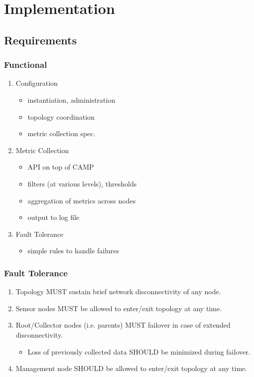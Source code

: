 \chapter{Implementation}
\label{implementation}

\section{Requirements}

\subsection{Functional}

\begin{enumerate}

\item Configuration
      \begin{itemize}
      \item instantiation, administration
      \item topology coordination
      \item metric collection spec.
      \end{itemize}

\item Metric Collection
      \begin{itemize}
      \item \dcamp API on top of CAMP
      \item filters (at various levels), thresholds
      \item aggregation of metrics across nodes
      \item output to log file
      \end{itemize}

\item Fault Tolerance
      \begin{itemize}
      \item simple rules to handle failures
      \end{itemize}

\end{enumerate}

\subsection{Fault Tolerance}

\begin{enumerate}

\item Topology MUST sustain brief network disconnectivity of any node.
\item Sensor nodes MUST be allowed to enter/exit topology at any time.
\item Root/Collector nodes (i.e. parents) MUST failover in case of extended disconnectivity.
      \begin{itemize}
      \item Loss of previously collected data SHOULD be minimized during failover.
      \end{itemize}
\item Management node SHOULD be allowed to enter/exit topology at any time.

\end{enumerate}

